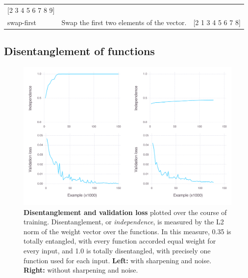 \documentclass[12pt,twoside]{mitthesis}
\begin{document}
\begin{longtable}[c]{@{}lll@{}}
\begin{minipage}[t]{0.22\columnwidth}
{[}2 3 4 5 6 7 8 9{]}
\strut\end{minipage}\tabularnewline
\begin{minipage}[t]{0.14\columnwidth}\raggedright\strut
swap-first
\strut\end{minipage} &
\begin{minipage}[t]{0.55\columnwidth}\raggedright\strut
Swap the first two elements of the vector.
\strut\end{minipage} &
\begin{minipage}[t]{0.22\columnwidth}\raggedright\strut
{[}2 1 3 4 5 6 7 8{]}
\strut\end{minipage}\tabularnewline
\bottomrule
\end{longtable}

\subsection{Disentanglement of
functions}\label{disentanglement-of-functions}

\begin{figure}[htbp]
\centering
\includegraphics{../figures/combo-loss-entanglement.png}
\caption{\label{fig:loss_entanglement}\textbf{Disentanglement and
validation loss} plotted over the course of training. Disentanglement,
or \emph{independence}, is measured by the L2 norm of the weight vector
over the functions. In this measure, 0.35 is totally entangled, with
every function accorded equal weight for every input, and 1.0 is totally
disentangled, with precisely one function used for each input.
\textbf{Left:} with sharpening and noise. \textbf{Right:} without
sharpening and noise.}
\end{figure}
\end{document}

